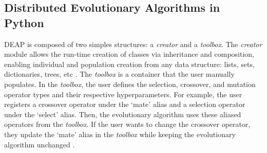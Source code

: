 \subsection{Distributed Evolutionary Algorithms in Python}
\label{sec:deap-works}
\gls{DEAP} is composed of two simples structures: a \textit{creator} and a 
\textit{toolbox}.  
The \textit{creator} module allows the run-time creation of classes via 
inheritance and composition, enabling individual and population creation 
from any data structure: lists, sets, dictionaries, trees, etc \cite{fortin_deap_2012}. 
The \textit{toolbox} is a container that the user manually populates.
In the \textit{toolbox}, the user defines the selection, crossover, and 
mutation operator types and their respective hyperparameters.
For example, the user registers a crossover operator under the `mate'
alias and a selection operator under the `select' alias. 
Then, the evolutionary algorithm uses these aliased operators from the 
\textit{toolbox}. 
If the user wants to change the crossover operator, they update the 
`mate' alias in the \textit{toolbox} while keeping the evolutionary algorithm 
unchanged \cite{fortin_deap_2012}. 

